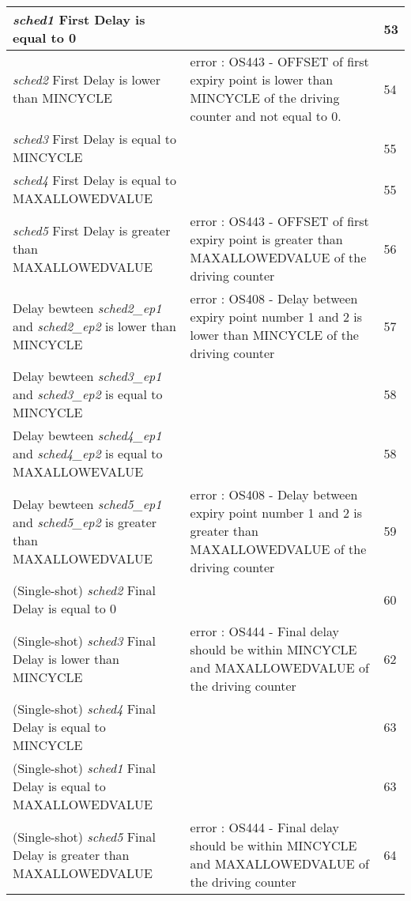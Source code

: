 \documentclass[10pt]{article}
\newlength{\Li}\settowidth{\Li}{Running}
\newlength{\Lii}\setlength{\Lii}{7cm}
\newlength{\Liiii}\setlength{\Liiii}{0.9cm}
\newlength{\Liii}\setlength{\Liii}{\textwidth} \addtolength{\Liii}{-\Li} \addtolength{\Liii}{-\Lii} \addtolength{\Liii}{-\Liiii}
\begin{document}
	\begin{supertabular}{|p{\Li}|p{\Lii}|p{\Liii}|} \hline 
	\textit{sched1} First Delay is equal to 0						& 																						& 53 \\ \hline
	\textit{sched2} First Delay is lower than MINCYCLE				& error : OS443 - OFFSET of first expiry point is lower than MINCYCLE of the driving counter and not equal to 0.	& 54 \\ \hline
	\textit{sched3} First Delay is equal to MINCYCLE				& 																						& 55 \\ \hline
	\textit{sched4} First Delay is equal to MAXALLOWEDVALUE		& 																						& 55 \\ \hline
	\textit{sched5} First Delay is greater than MAXALLOWEDVALUE	& error : OS443 - OFFSET of first expiry point is greater than MAXALLOWEDVALUE of the driving counter 		& 56 \\ \hline
	Delay bewteen \textit{sched2\_ep1} and \textit{sched2\_ep2}  is lower than MINCYCLE	& error : OS408 - Delay between expiry point number 1 and 2 is lower than MINCYCLE of the driving counter & 57 \\ \hline
	Delay bewteen \textit{sched3\_ep1} and \textit{sched3\_ep2}  is equal to MINCYCLE	& 																					& 58 \\ \hline
	Delay bewteen \textit{sched4\_ep1} and \textit{sched4\_ep2}  is equal to MAXALLOWEVALUE	& 																			& 58 \\ \hline
	Delay bewteen \textit{sched5\_ep1} and \textit{sched5\_ep2}  is greater than MAXALLOWEDVALUE	& error : OS408 - Delay between expiry point number 1 and 2 is greater than MAXALLOWEDVALUE of the driving counter	& 59 \\ \hline
	(Single-shot) \textit{sched2} Final Delay is equal to 0			& 																						& 60 \\ \hline
	(Single-shot) \textit{sched3} Final Delay is lower than MINCYCLE	& error : OS444 - Final delay should be within MINCYCLE and MAXALLOWEDVALUE of the driving counter		& 62 \\ \hline	
	(Single-shot) \textit{sched4} Final Delay is equal to MINCYCLE	& 																						& 63 \\ \hline	
	(Single-shot) \textit{sched1} Final Delay is equal to MAXALLOWEDVALUE	&																				& 63 \\ \hline	
	(Single-shot) \textit{sched5} Final Delay is greater than MAXALLOWEDVALUE & error : OS444 - Final delay should be within MINCYCLE and MAXALLOWEDVALUE of the driving counter	& 64 \\ \hline
	\end{supertabular}\\
		
\end{document}
